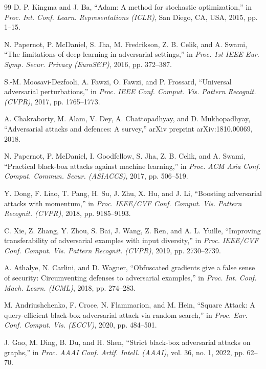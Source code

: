 \documentclass[12pt]{article}
\begin{document}
\begin{thebibliography}{99}
 D. P. Kingma and J. Ba, ``Adam: A method for stochastic optimization,'' in \textit{Proc. Int. Conf. Learn. Representations (ICLR)}, San Diego, CA, USA, 2015, pp. 1--15.

 N. Papernot, P. McDaniel, S. Jha, M. Fredrikson, Z. B. Celik, and A. Swami, ``The limitations of deep learning in adversarial settings,'' in \textit{Proc. 1st IEEE Eur. Symp. Secur. Privacy (EuroS\&P)}, 2016, pp. 372--387.

 S.-M. Moosavi-Dezfooli, A. Fawzi, O. Fawzi, and P. Frossard, ``Universal adversarial perturbations,'' in \textit{Proc. IEEE Conf. Comput. Vis. Pattern Recognit. (CVPR)}, 2017, pp. 1765--1773.

 A. Chakraborty, M. Alam, V. Dey, A. Chattopadhyay, and D. Mukhopadhyay, ``Adversarial attacks and defences: A survey,'' arXiv preprint arXiv:1810.00069, 2018.

 N. Papernot, P. McDaniel, I. Goodfellow, S. Jha, Z. B. Celik, and A. Swami, ``Practical black-box attacks against machine learning,'' in \textit{Proc. ACM Asia Conf. Comput. Commun. Secur. (ASIACCS)}, 2017, pp. 506--519.

 Y. Dong, F. Liao, T. Pang, H. Su, J. Zhu, X. Hu, and J. Li, ``Boosting adversarial attacks with momentum,'' in \textit{Proc. IEEE/CVF Conf. Comput. Vis. Pattern Recognit. (CVPR)}, 2018, pp. 9185--9193.

 C. Xie, Z. Zhang, Y. Zhou, S. Bai, J. Wang, Z. Ren, and A. L. Yuille, ``Improving transferability of adversarial examples with input diversity,'' in \textit{Proc. IEEE/CVF Conf. Comput. Vis. Pattern Recognit. (CVPR)}, 2019, pp. 2730--2739.

 A. Athalye, N. Carlini, and D. Wagner, ``Obfuscated gradients give a false sense of security: Circumventing defenses to adversarial examples,'' in \textit{Proc. Int. Conf. Mach. Learn. (ICML)}, 2018, pp. 274--283.

 M. Andriushchenko, F. Croce, N. Flammarion, and M. Hein, ``Square Attack: A query-efficient black-box adversarial attack via random search,'' in \textit{Proc. Eur. Conf. Comput. Vis. (ECCV)}, 2020, pp. 484--501.

 J. Gao, M. Ding, B. Du, and H. Shen, ``Strict black-box adversarial attacks on graphs,'' in \textit{Proc. AAAI Conf. Artif. Intell. (AAAI)}, vol. 36, no. 1, 2022, pp. 62--70.


\end{thebibliography}
\end{document}
